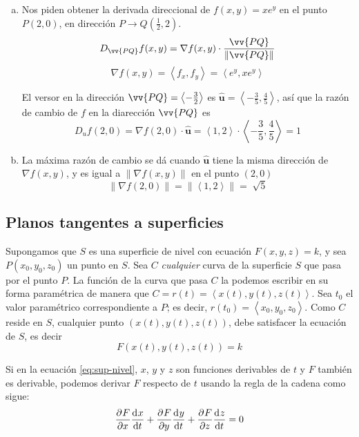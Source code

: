 \documentclass[12pt]{article}
\begin{document}
\begin{enumerate}[a)]
	\item Nos piden obtener la derivada direccional de $ f(x,y)=xe^y $ en el punto $ P(2,0) $, en dirección $ P \to Q(\frac{1}{2},2) $.
		\[
			D_{\vv{PQ}}f(x,y) = \nabla f(x,y) \cdot \frac{\vv{PQ}}{\lVert\vv{PQ}\rVert}
		\]
		\[
			\nabla f(x,y) = \left\langle f_{x},f_{y} \right\rangle = \left\langle e^y,xe^y \right\rangle
		\]
		
	El versor en la dirección $ \vv{PQ}=\left\langle -\frac{3}{2} \right\rangle $ es $ \mathbf{\hat{u}}=\left\langle -\frac{3}{5},\frac{4}{5} \right\rangle $, así que la razón de cambio de $ f $ en la diarección $ \vv{PQ} $ es
	\[
	D_{u}f(2,0)=\nabla f(2,0)\cdot \mathbf{\hat{u}} = \left\langle 1,2 \right\rangle \cdot \left\langle -\frac{3}{5},\frac{4}{5} \right\rangle = 1
	\]

\item La máxima razón de cambio se dá cuando $ \mathbf{\hat{u}} $ tiene la misma dirección de $ \nabla f(x,y) $, y es igual a $ \lVert\nabla f(x,y)\rVert $ en el punto $ (2,0) $
	\[
	\lVert\nabla f(2,0)\rVert = \lVert\left\langle 1,2 \right\rangle\rVert = \sqrt[]{5}
	\]
\end{enumerate}

\subsection{Planos tangentes a superficies}
Supongamos que $ S $ es una superficie de nivel con ecuación $ F(x,y,z)=k $, y sea $ P(x_{0},y_{0},z_{0}) $ un punto en $ S $. Sea $ C $ \textit{cualquier} curva de la superficie $ S $ que pasa por el punto $ P $. La función de la curva que pasa $ C $ la podemos escribir en su forma paramétrica de manera que $ C = r(t) = \left\langle x(t),y(t),z(t) \right\rangle $. Sea $ t_{0} $ el valor paramétrico correspondiente a $ P $; es decir, $ r(t_{0}) = \left\langle x_{0},y_{0},z_{0} \right\rangle $. Como $ C $ reside en $ S $, cualquier punto $ \left(x(t),y(t),z(t)\right) $, debe satisfacer la ecuación de $ S $, es decir
\begin{equation}\label{eq:sup-nivel}
F\left(x(t),y(t),z(t)\right) = k
\end{equation}

Si en la ecuación \ref{eq:sup-nivel}, $ x $, $ y $ y $ z $ son funciones derivables de $ t $ y $ F $ también es derivable, podemos derivar $ F $ respecto de $ t $ usando la regla de la cadena como sigue:
\begin{equation}\label{eq:dv-sup-nivel-Ft}
\pdv[]{F}{x}\dv[]{x}{t} + \pdv[]{F}{y}\dv[]{y}{t} + \pdv[]{F}{z}\dv[]{z}{t} = 0
\end{equation}
\end{document}
